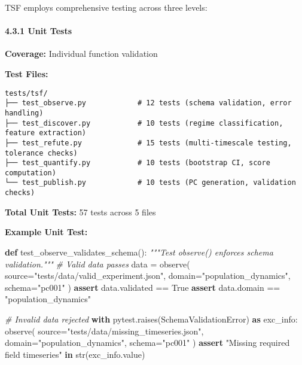 \documentclass[
]{article}
\newenvironment{Shaded}{}{}
\newcommand{\BuiltInTok}[1]{\textcolor[rgb]{0.00,0.50,0.00}{#1}}
\newcommand{\CommentTok}[1]{\textcolor[rgb]{0.38,0.63,0.69}{\textit{#1}}}
\newcommand{\ControlFlowTok}[1]{\textcolor[rgb]{0.00,0.44,0.13}{\textbf{#1}}}
\newcommand{\ImportTok}[1]{\textcolor[rgb]{0.00,0.50,0.00}{\textbf{#1}}}
\newcommand{\KeywordTok}[1]{\textcolor[rgb]{0.00,0.44,0.13}{\textbf{#1}}}
\newcommand{\NormalTok}[1]{#1}
\newcommand{\OperatorTok}[1]{\textcolor[rgb]{0.40,0.40,0.40}{#1}}
\newcommand{\StringTok}[1]{\textcolor[rgb]{0.25,0.44,0.63}{#1}}
\newcommand{\VariableTok}[1]{\textcolor[rgb]{0.10,0.09,0.49}{#1}}
\begin{document}
TSF employs comprehensive testing across three levels:

\paragraph{4.3.1 Unit Tests}\label{unit-tests}

\textbf{Coverage:} Individual function validation

\textbf{Test Files:}

\begin{verbatim}
tests/tsf/
├── test_observe.py            # 12 tests (schema validation, error handling)
├── test_discover.py           # 10 tests (regime classification, feature extraction)
├── test_refute.py             # 15 tests (multi-timescale testing, tolerance checks)
├── test_quantify.py           # 10 tests (bootstrap CI, score computation)
└── test_publish.py            # 10 tests (PC generation, validation checks)
\end{verbatim}

\textbf{Total Unit Tests:} 57 tests across 5 files

\textbf{Example Unit Test:}

\begin{Shaded}
\begin{Highlighting}[]
\KeywordTok{def}\NormalTok{ test\_observe\_validates\_schema():}
    \CommentTok{"""Test observe() enforces schema validation."""}
    \CommentTok{\# Valid data passes}
\NormalTok{    data }\OperatorTok{=}\NormalTok{ observe(}
\NormalTok{        source}\OperatorTok{=}\StringTok{"tests/data/valid\_experiment.json"}\NormalTok{,}
\NormalTok{        domain}\OperatorTok{=}\StringTok{"population\_dynamics"}\NormalTok{,}
\NormalTok{        schema}\OperatorTok{=}\StringTok{"pc001"}
\NormalTok{    )}
    \ControlFlowTok{assert}\NormalTok{ data.validated }\OperatorTok{==} \VariableTok{True}
    \ControlFlowTok{assert}\NormalTok{ data.domain }\OperatorTok{==} \StringTok{"population\_dynamics"}

    \CommentTok{\# Invalid data rejected}
    \ControlFlowTok{with}\NormalTok{ pytest.raises(SchemaValidationError) }\ImportTok{as}\NormalTok{ exc\_info:}
\NormalTok{        observe(}
\NormalTok{            source}\OperatorTok{=}\StringTok{"tests/data/missing\_timeseries.json"}\NormalTok{,}
\NormalTok{            domain}\OperatorTok{=}\StringTok{"population\_dynamics"}\NormalTok{,}
\NormalTok{            schema}\OperatorTok{=}\StringTok{"pc001"}
\NormalTok{        )}
    \ControlFlowTok{assert} \StringTok{"Missing required field \textquotesingle{}timeseries\textquotesingle{}"} \KeywordTok{in} \BuiltInTok{str}\NormalTok{(exc\_info.value)}
\end{Highlighting}
\end{Shaded}
\end{document}
